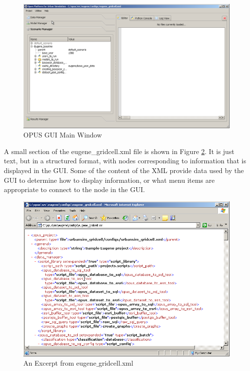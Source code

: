 \begin{figure}[htp]
\begin{center}
\includegraphics[scale=0.4]{graphics/opus2.png}
\end{center}
\caption{OPUS GUI Main Window}
\label{fig:opus2}
\end{figure}

A small section of the eugene\_gridcell.xml file is shown in Figure \ref{fig:opus-xml}.  It is just text, but in a structured format, with nodes corresponding to information that is displayed in the GUI.  Some of the content of the XML provide data used by the GUI to determine how to display information, or what menu items are appropriate to connect to the node in the GUI.

\begin{figure}[htp]
\begin{center}
\includegraphics[scale=0.4]{graphics/opus-xml.png}
\end{center}
\caption{An Excerpt from eugene$\_$gridcell.xml}
\label{fig:opus-xml}
\end{figure}

